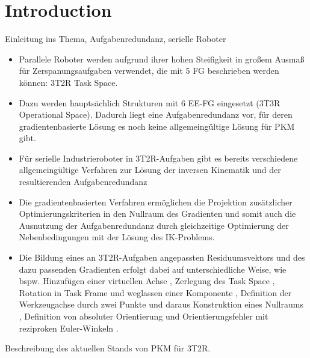 \documentclass[robotics,article,submit,moreauthors,pdftex]{Definitions/mdpi}
\begin{document}

\section{Introduction}
\label{sec:intro}

Einleitung ins Thema, Aufgabenredundanz, serielle Roboter
\begin{itemize}
	\item Parallele Roboter werden aufgrund ihrer hohen Steifigkeit in großem Ausmaß für Zerspanungsaufgaben verwendet, die mit 5 FG beschrieben werden können: 3T2R Task Space.
	\item Dazu werden hauptsächlich Strukturen mit 6 EE-FG eingesetzt (3T3R Operational Space). Dadurch liegt eine Aufgabenredundanz vor, für deren gradientenbasierte Lösung es noch keine allgemeingültige Lösung für PKM gibt.
	\item Für serielle Industrieroboter in 3T2R-Aufgaben gibt es bereits verschiedene allgemeingültige Verfahren zur Lösung der inversen Kinematik und der resultierenden Aufgabenredundanz \cite{Baron2000,HuoBar2005,Zlajpah2017,LegerAng2016,ZhuQuCaoYan2013,GuoDonKe2015,MousaviGagBouRay2018,1_SchapplerTapOrt2019}
	\item Die gradientenbasierten Verfahren \cite{Baron2000,HuoBar2005,Zlajpah2017,LegerAng2016,1_SchapplerTapOrt2019} ermöglichen die Projektion zusätzlicher Optimierungskriterien in den Nullraum des Gradienten und somit auch die Ausnutzung der Aufgabenredundanz durch gleichzeitige Optimierung der Nebenbedingungen mit der Lösung des IK-Problems.
	\item Die Bildung eines an 3T2R-Aufgaben angepassten Residuumsvektors und des dazu passenden Gradienten erfolgt dabei auf unterschiedliche Weise, wie bspw. Hinzufügen einer virtuellen Achse \cite{Baron2000}, Zerlegung des Task Space \cite{HuoBar2005}, Rotation in Task Frame und weglassen einer Komponente \cite{Zlajpah2017}, Definition der Werkzeugachse durch zwei Punkte und daraus Konstruktion eines Nullraums \cite{LegerAng2016}, Definition von absoluter Orientierung und Orientierungsfehler mit reziproken Euler-Winkeln \cite{1_SchapplerTapOrt2019}.
\end{itemize}

Beschreibung des aktuellen Stands von PKM für 3T2R.
\end{document}
